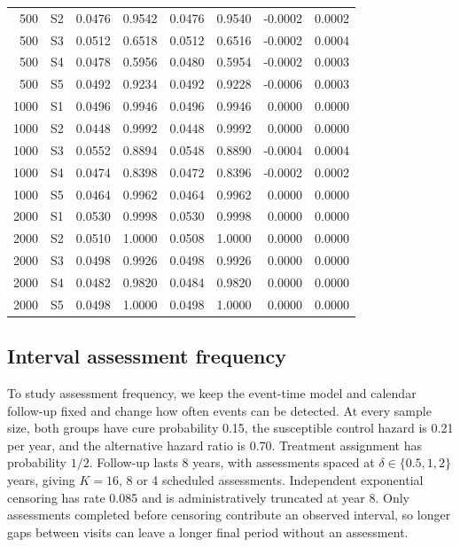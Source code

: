 \documentclass[12pt]{article}
\theoremstyle{definition}
\theoremstyle{remark}
\begin{document}
\begin{longtable}{rcrrrrrr}
500 & S2 & 0.0476 & 0.9542 & 0.0476 & 0.9540 & -0.0002 & 0.0002 \\
500 & S3 & 0.0512 & 0.6518 & 0.0512 & 0.6516 & -0.0002 & 0.0004 \\
500 & S4 & 0.0478 & 0.5956 & 0.0480 & 0.5954 & -0.0002 & 0.0003 \\
500 & S5 & 0.0492 & 0.9234 & 0.0492 & 0.9228 & -0.0006 & 0.0003 \\
1000 & S1 & 0.0496 & 0.9946 & 0.0496 & 0.9946 & 0.0000 & 0.0000 \\
1000 & S2 & 0.0448 & 0.9992 & 0.0448 & 0.9992 & 0.0000 & 0.0000 \\
1000 & S3 & 0.0552 & 0.8894 & 0.0548 & 0.8890 & -0.0004 & 0.0004 \\
1000 & S4 & 0.0474 & 0.8398 & 0.0472 & 0.8396 & -0.0002 & 0.0002 \\
1000 & S5 & 0.0464 & 0.9962 & 0.0464 & 0.9962 & 0.0000 & 0.0000 \\
2000 & S1 & 0.0530 & 0.9998 & 0.0530 & 0.9998 & 0.0000 & 0.0000 \\
2000 & S2 & 0.0510 & 1.0000 & 0.0508 & 1.0000 & 0.0000 & 0.0000 \\
2000 & S3 & 0.0498 & 0.9926 & 0.0498 & 0.9926 & 0.0000 & 0.0000 \\
2000 & S4 & 0.0482 & 0.9820 & 0.0484 & 0.9820 & 0.0000 & 0.0000 \\
2000 & S5 & 0.0498 & 1.0000 & 0.0498 & 1.0000 & 0.0000 & 0.0000 \\
\end{longtable}
\endgroup

\clearpage
\subsection{Interval assessment frequency}
\label{sec:assessment-frequency}
To study assessment frequency, we keep the event-time model and calendar follow-up fixed and change how often events can be detected. At every sample size, both groups have cure probability 0.15, the susceptible control hazard is 0.21 per year, and the alternative hazard ratio is 0.70. Treatment assignment has probability $1/2$. Follow-up lasts 8 years, with assessments spaced at $\delta\in\{0.5,1,2\}$ years, giving $K=16$, 8 or 4 scheduled assessments. Independent exponential censoring has rate 0.085 and is administratively truncated at year 8. Only assessments completed before censoring contribute an observed interval, so longer gaps between visits can leave a longer final period without an assessment.
\end{document}
